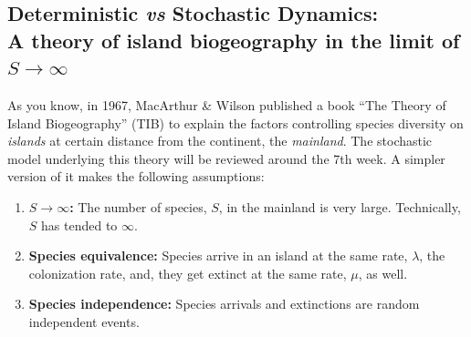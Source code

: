 \subsection{Deterministic {\em vs} Stochastic Dynamics:\\ A theory of island biogeography in the limit of $S \rightarrow \infty$}
As you know, in 1967, MacArthur \& Wilson published a book ``The Theory of Island Biogeography'' (TIB) to explain the factors controlling species diversity on {\em islands} at certain distance from the continent, the {\em mainland}. The stochastic model underlying this theory will be reviewed around the 7th week. A simpler version of it makes the following assumptions:
\begin{enumerate}
  \item {\bf $S \rightarrow \infty$:} The number of species, $S$, in the mainland is very large. Technically, $S$ has tended to $\infty$.
  \item {\bf Species equivalence:} Species arrive in an island at the same rate, $\lambda$, the colonization rate, and, they get extinct at the same rate, $\mu$, as well.
  \item {\bf Species independence:} Species arrivals and extinctions are random independent events. 
\end{enumerate}

